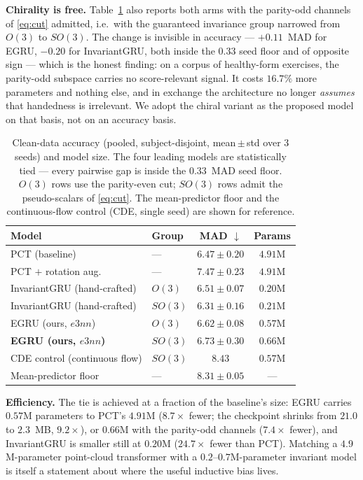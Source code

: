 \documentclass[10pt,journal]{IEEEtran}
\begin{document}
\textbf{Chirality is free.} Table~\ref{tab:accuracy} also reports both arms with the parity-odd
channels of \eqref{eq:cut} admitted, i.e.\ with the guaranteed invariance group narrowed from $O(3)$
to $SO(3)$. The change is invisible in accuracy --- $+0.11$~MAD for EGRU, $-0.20$ for InvariantGRU,
both inside the $0.33$ seed floor and of opposite sign --- which is the honest finding: on a corpus of
healthy-form exercises, the parity-odd subspace carries no score-relevant signal. It costs $16.7\%$
more parameters and nothing else, and in exchange the architecture no longer \emph{assumes} that
handedness is irrelevant. We adopt the chiral variant as the proposed model on that basis, not on an
accuracy basis.

\begin{table}[!t]
\centering
\caption{Clean-data accuracy (pooled, subject-disjoint, mean\,$\pm$\,std over 3 seeds) and model
size. The four leading models are statistically tied --- every pairwise gap is inside the $0.33$~MAD
seed floor. $O(3)$ rows use the parity-even cut; $SO(3)$ rows admit the pseudo-scalars of
\eqref{eq:cut}. The mean-predictor floor and the continuous-flow control (CDE, single seed) are shown
for reference.}
\label{tab:accuracy}
\small
\setlength{\tabcolsep}{4pt}
\begin{tabular}{llcc}
\toprule
Model & Group & MAD $\downarrow$ & Params \\
\midrule
PCT (baseline)                & --- & $\mathbf{6.47 \pm 0.20}$ & $4.91$M \\
PCT $+$ rotation aug.         & --- & $7.47 \pm 0.23$ & $4.91$M \\
InvariantGRU (hand-crafted)   & $O(3)$  & $\mathbf{6.51 \pm 0.07}$ & $0.20$M \\
InvariantGRU (hand-crafted)   & $SO(3)$ & $\mathbf{6.31 \pm 0.16}$ & $0.21$M \\
EGRU (ours, $e3nn$)           & $O(3)$  & $\mathbf{6.62 \pm 0.08}$ & $0.57$M \\
\textbf{EGRU (ours, $e3nn$)}  & $SO(3)$ & $\mathbf{6.73 \pm 0.30}$ & $0.66$M \\
\midrule
CDE control (continuous flow) & $SO(3)$ & $8.43$\phantom{$\,\pm0.00$} & $0.57$M \\
Mean-predictor floor          & --- & $8.31 \pm 0.05$ & --- \\
\bottomrule
\end{tabular}
\end{table}

\textbf{Efficiency.} The tie is achieved at a fraction of the baseline's size: EGRU carries
$0.57$M parameters to PCT's $4.91$M ($8.7\times$ fewer; the checkpoint shrinks from $21.0$ to
$2.3$~MB, $9.2\times$), or $0.66$M with the parity-odd channels ($7.4\times$ fewer), and InvariantGRU
is smaller still at $0.20$M ($24.7\times$ fewer than PCT). Matching a $4.9$M-parameter point-cloud
transformer with a $0.2$--$0.7$M-parameter invariant model is itself a statement about where the
useful inductive bias lives.
\end{document}
